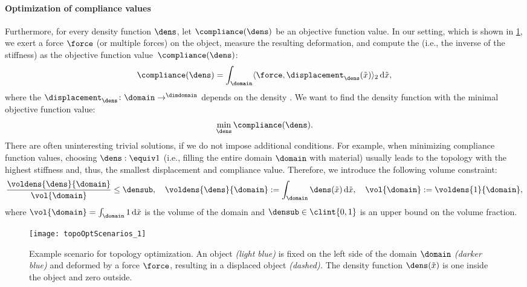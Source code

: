 \paragraph{Optimization of compliance values}

Furthermore, for every density function $\dens$,
let $\compliance(\dens)$ be an objective function value.
In our setting, which is shown in \cref{fig:topoOptExampleScenario},
we exert a force $\force$ (or multiple forces) on the object,
measure the resulting deformation, and
compute the  (i.e., the inverse of the stiffness) as
the objective function value~$\compliance(\dens)$:
\begin{equation}
  \compliance(\dens)
  = \int_{\domain} \innerprod[2]{\force}{\displacement_{\dens}(\tilde{\*x})}
  \diff\tilde{\*x},
\end{equation}
where the 
$\displacement_{\dens}\colon \domain \to \real^{\dimdomain}$
depends on the density \cite{Huebner14Mehrdimensionale}.
We want to find the density function
with the minimal objective function value:
\begin{equation}
  \label{eq:topoOptProblemContinuous}
  \min_{\dens} \compliance(\dens).
\end{equation}
There are often uninteresting trivial solutions,
if we do not impose additional conditions.
For example, when minimizing compliance function values,
choosing $\dens :\equiv 1$
(i.e., filling the entire domain $\domain$ with material)
usually leads to the topology with the
highest stiffness and, thus, the smallest displacement and compliance value.
Therefore, we introduce the following volume constraint:
\begin{equation}
  \frac{\voldens{\dens}{\domain}}{\vol{\domain}} \le \densub,\quad
  \voldens{\dens}{\domain}
  := \int_{\domain} \dens(\tilde{\*x}) \diff\tilde{\*x},\quad
  \vol{\domain}
  := \voldens{1}{\domain},
\end{equation}
where $\vol{\domain} = \int_{\domain} 1 \diff\tilde{\*x}$
is the volume of the domain and
$\densub \in \clint{0, 1}$ is an upper bound on the volume fraction.

\begin{SCfigure}
  \texttt{[image: topoOptScenarios\_1]}%
  \caption[%
    Example scenario for topology optimization%
  ]{%
    Example scenario for topology optimization.
    An object \emph{\textcolor{hellblau}{(light blue)}}
    is fixed on the left side
    of the domain $\domain$
    \emph{\textcolor{mittelblau!50}{(darker blue)}}
    and deformed by a force $\force$, resulting in a displaced object
    \emph{(dashed).}
    The density function $\dens(\tilde{\*x})$ is one inside the object
    and zero outside.%
  }%
  \label{fig:topoOptExampleScenario}%
\end{SCfigure}




